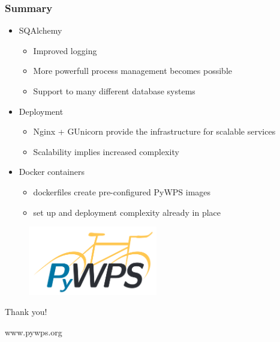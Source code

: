 \documentclass{beamer}
\begin{document}
\begin{frame}
\frametitle<presentation>{Summary}

\begin{itemize}
  \item SQAlchemy
  \begin{itemize} 
    \item Improved logging 
    \item More powerfull process management becomes possible
    \item Support to many different database systems
  \end{itemize} 
  \item Deployment   
  \begin{itemize} 
    \item Nginx + GUnicorn provide the infrastructure for scalable services
    \item Scalability implies increased complexity
  \end{itemize} 
  \item{Docker containers}
  \begin{itemize} 
    \item dockerfiles create pre-configured PyWPS images
    \item set up and deployment complexity already in place
  \end{itemize} 
\end{itemize}

\end{frame}

\begin{frame}

  \begin{figure}[ht]
   \centering
   \includegraphics[height=3cm]{figures/pywps}
  \end{figure}

\centering
\Huge{Thank you!}

\vspace{0.4cm}
\normalsize{www.pywps.org}
\end{frame}
\end{document}
